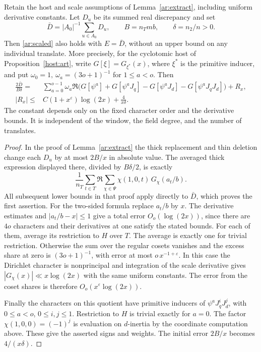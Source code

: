\begin{proposition}\label{ar:mean}
Retain the host and scale assumptions of Lemma~\ref{ar:extract},
including uniform derivative constants. Let \(D_u\) be its summed
real discrepancy and set
\[
 \bar D=|A_0|^{-1}\sum_{u\in A_0}D_u,\qquad
 B=n_Tmb,\qquad \delta=n_2/n>0 .
\]
Then \eqref{ar:scaled} also holds with \(E=\bar D\), without an
upper bound on any individual translate. More precisely, for the
cyclotomic host of Proposition~\ref{host:art}, write
\(G[\xi]=G_{\xi^\ast}(x)\), where \(\xi^\ast\) is the primitive
inducer, and put \(\omega_0=1,\ \omega_a=(3o+1)^{-1}\) for
\(1\le a<o\). Then
\[
\begin{aligned}
 \frac{2\bar D}{B\delta}
  ={}&\sum_{a=0}^{o-1}\omega_a\Re\big(
          G[\psi^a]+G[\psi^aJ_q]-G[\psi^aJ_d]
                        -G[\psi^aJ_qJ_d]\big)+R_x,\\
 |R_x|\le{}&C(1+x^\varepsilon)\log(2x)+\frac{4}{x\delta}.
\end{aligned}
\]
The constant depends only on the fixed character order and the
derivative bounds. It is independent of the window, the field
degree, and the number of translates.
\end{proposition}
\begin{proof}
In the proof of Lemma~\ref{ar:extract} the thick replacement and
thin deletion change each \(D_u\) by at most \(2B/x\) in absolute
value. The averaged thick expression displayed there, divided by
\(B\delta/2\), is exactly
\[
 \frac{1}{n_T}\sum_{t\in T}\Re\sum_{\chi\in\Psi}
                         \chi(1,0,t)\,G_\chi(a_t/b).
\]
All subsequent lower bounds in that proof apply directly to
\(\bar D\), which proves the first assertion. For the two-sided
formula replace \(a_t/b\) by \(x\). The derivative estimates and
\(|a_t/b-x|\le1\) give a total error \(O_o(\log(2x))\), since there
are \(4o\) characters and their derivatives at one satisfy the
stated bounds. For each of them, average its restriction to \(H\)
over \(T\). The average is exactly one for trivial restriction.
Otherwise the sum over the regular cosets vanishes and the excess
share at zero is \((3o+1)^{-1}\), with error at most
\(o\,x^{-1+\varepsilon}\). In this case the Dirichlet character is
nonprincipal and integration of the scale derivative gives
\(|G_\chi(x)|\ll x\log(2x)\) with the same uniform constants.
The error from the coset shares is therefore
\(O_o(x^\varepsilon\log(2x))\).

Finally the characters on this quotient have primitive inducers
of \(\psi^a J_q^iJ_d^j\), with \(0\le a<o\), \(0\le i,j\le1\).
Restriction to \(H\) is trivial exactly for \(a=0\). The factor
\(\chi(1,0,0)=(-1)^j\) is evaluation on \(d\)-inertia by the
coordinate computation above. These give the asserted signs and
weights. The initial error \(2B/x\) becomes \(4/(x\delta)\).
\end{proof}

